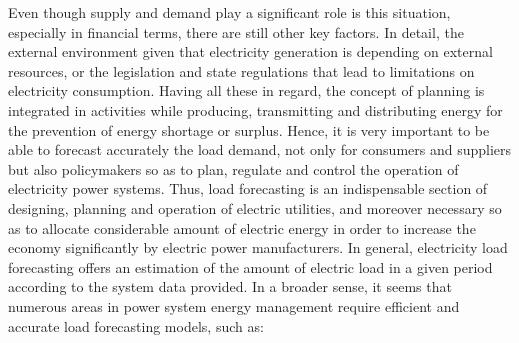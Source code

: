 \par Even though supply and demand play a significant role is this situation, especially in financial terms, there are still other key factors. In detail, the external environment given that electricity generation is depending on external resources, or the legislation and state regulations that lead to limitations on electricity consumption. Having all these in regard, the concept of planning is integrated in activities while producing, transmitting and distributing energy for the prevention of energy shortage or surplus. Hence, it is very important to be able to forecast accurately the load demand, not only for consumers and suppliers but also policymakers so as to plan, regulate and control the operation of electricity power systems.  Thus, load forecasting is an indispensable section of designing, planning and operation of electric utilities, and moreover necessary so as to allocate considerable amount of electric energy in order to increase the economy significantly by electric power manufacturers. In general, electricity load forecasting offers an estimation of the amount of electric load in a given period according to the system data provided. In a broader sense, it seems that numerous areas in power system energy management require efficient and accurate load forecasting models, such as:
